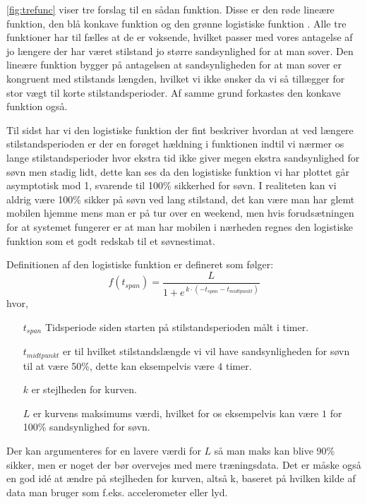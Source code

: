 \cref{fig:trefunc} viser tre forslag til en sådan funktion.
Disse er den røde lineære funktion, den blå konkave funktion og den grønne logistiske funktion \citep{wiki:LogisticFunction}.
Alle tre funktioner har til fælles at de er voksende, hvilket passer med vores antagelse af jo længere der har været stilstand jo større sandsynlighed for at man sover.
Den lineære funktion bygger på antagelsen at sandsynligheden for at man sover er kongruent med stilstands længden, hvilket vi ikke ønsker da vi så tillægger for stor vægt til korte stilstandsperioder.
Af samme grund forkastes den konkave funktion også.

Til sidst har vi den logistiske funktion der fint beskriver hvordan at ved længere stilstandsperioden er der en forøget hældning i funktionen indtil vi nærmer os lange stilstandsperioder hvor ekstra tid ikke giver megen ekstra sandsynlighed for søvn men stadig lidt, dette kan ses da den logistiske funktion vi har plottet går asymptotisk mod 1, svarende til 100\% sikkerhed for søvn.
I realiteten kan vi aldrig være 100\% sikker på søvn ved lang stilstand, det kan være man har glemt mobilen hjemme mens man er på tur over en weekend, men hvis forudsætningen for at systemet fungerer er at man har mobilen i nærheden regnes den logistiske funktion som et godt redskab til et søvnestimat.

Definitionen af den logistiske funktion er defineret som følger:
\begin{equation}
	f(t_{span}) = \frac{L}{1+e^{\,k\cdot(-t_{span} - t_{midtpunkt})}}
\end{equation} 
hvor,
\begin{itemize}
	\item[$t_{span}$] Tidsperiode siden starten på stilstandsperioden målt i timer.
	\item[$t_{midtpunkt}$] er til hvilket stilstandslængde vi vil have sandsynligheden for søvn til at være 50\%, dette kan eksempelvis være $4$ timer.
	\item[$k$] er stejlheden for kurven.
	\item[$L$] er kurvens maksimums værdi, hvilket for os eksempelvis kan være $1$ for 100\% sandsynlighed for søvn.
\end{itemize}

Der kan argumenteres for en lavere værdi for $L$ så man maks kan blive 90\% sikker, men er noget der bør overvejes med mere træningsdata. Det er måske også en god idé at ændre på stejlheden for kurven, altså k, baseret på hvilken kilde af data man bruger som f.eks. accelerometer eller lyd.

